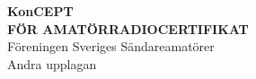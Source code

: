 \AddToShipoutPicture*{\BackgroundPic}




\onecolumn
\vspace{3cm}
\begin{center}
{\fontsize{2.4cm}{2.88cm}\bfseries{\color{white}KonCEPT}} \\[2ex]
\Large{\bfseries{\color{white}FÖR AMATÖRRADIOCERTIFIKAT}} \\[2ex]
\huge{\color{white}Föreningen Sveriges Sändareamatörer} \\
\Large{\color{white}Andra upplagan}
\end{center}
\twocolumn

\clearpage
